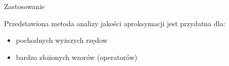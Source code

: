 \begin{frame}{Zastosowanie}
	\begin{block}{}
		Przedstawiona metoda analizy jakości aproksymacji jest przydatna 
        dla:
        \begin{itemize}
        \item pochodnych wyższych rzędow
        \item bardzo złożonych wzorów (operatorów)
        \end{itemize}
	\end{block}
\end{frame}















